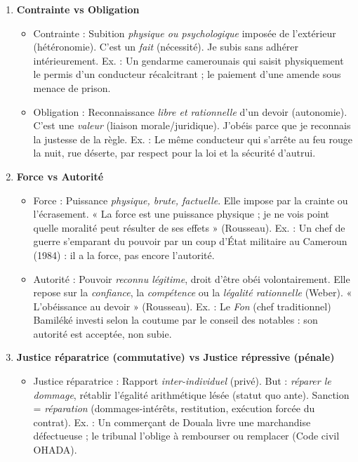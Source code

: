 \documentclass[11pt]{article}
\newcommand{\cle}[1]{{\popxbold\color{popdark}#1}}
\begin{document}
\begin{corrige}
\begin{enumerate}
    \item \textbf{Contrainte vs Obligation}
    \begin{itemize}
        \item \cle{Contrainte} : Subition \emph{physique ou psychologique} imposée de l'extérieur (hétéronomie). C'est un \emph{fait} (nécessité). Je subis sans adhérer intérieurement. Ex. : Un gendarme camerounais qui saisit physiquement le permis d'un conducteur récalcitrant ; le paiement d'une amende sous menace de prison.
        \item \cle{Obligation} : Reconnaissance \emph{libre et rationnelle} d'un devoir (autonomie). C'est une \emph{valeur} (liaison morale/juridique). J'obéis parce que je reconnais la justesse de la règle. Ex. : Le même conducteur qui s'arrête au feu rouge la nuit, rue déserte, par respect pour la loi et la sécurité d'autrui.
    \end{itemize}
    \item \textbf{Force vs Autorité}
    \begin{itemize}
        \item \cle{Force} : Puissance \emph{physique, brute, factuelle}. Elle impose par la crainte ou l'écrasement. « La force est une puissance physique ; je ne vois point quelle moralité peut résulter de ses effets » (Rousseau). Ex. : Un chef de guerre s'emparant du pouvoir par un coup d'État militaire au Cameroun (1984) : il a la force, pas encore l'autorité.
        \item \cle{Autorité} : Pouvoir \emph{reconnu légitime}, droit d'être obéi volontairement. Elle repose sur la \emph{confiance}, la \emph{compétence} ou la \emph{légalité rationnelle} (Weber). « L'obéissance au devoir » (Rousseau). Ex. : Le \emph{Fon} (chef traditionnel) Bamiléké investi selon la coutume par le conseil des notables : son autorité est acceptée, non subie.
    \end{itemize}
    \item \textbf{Justice réparatrice (commutative) vs Justice répressive (pénale)}
    \begin{itemize}
        \item \cle{Justice réparatrice} : Rapport \emph{inter-individuel} (privé). But : \emph{réparer le dommage}, rétablir l'égalité arithmétique lésée (statut quo ante). Sanction = \emph{réparation} (dommages-intérêts, restitution, exécution forcée du contrat). Ex. : Un commerçant de Douala livre une marchandise défectueuse ; le tribunal l'oblige à rembourser ou remplacer (Code civil OHADA).

\end{itemize}
\end{enumerate}
\end{corrige}
\end{document}
